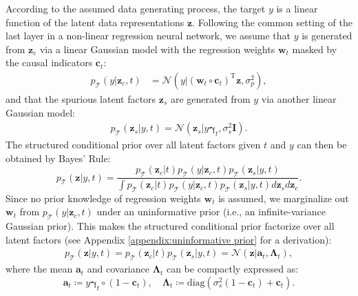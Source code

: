 \documentclass[10pt]{article} %
\theoremstyle{plain}
\theoremstyle{definition}
\begin{document}
According to the assumed data generating process, the target $y$ is a linear function of the latent data representations $\mathbf{z}$. Following the common setting of the last layer in a non-linear regression neural network, we assume that $y$ is generated from $\mathbf{z}_c$ via a linear Gaussian model with the regression weights $\mathbf{w}_t$ masked by the causal indicators $\mathbf{c}_t$:
\begin{align}\label{eq: regression-model}
    p_{\mathcal{T}}(y|\mathbf{z}_c,t) & =\mathcal{N}(y|(\mathbf{w}_t\circ\mathbf{c}_t)^{\text{T}}\mathbf{z},\sigma_{p}^{2}),
\end{align}
and that the spurious latent factors $\mathbf{z}_s$ are generated from $y$ via another linear Gaussian model:
\begin{align}
    p_{\mathcal{T}}(\mathbf{z}_s|y,t)=\mathcal{N}(\mathbf{z}_s|y\boldsymbol{\gamma}_t,\sigma_s^2\mathbf{I}).\label{eq:spurious_prior}
\end{align}
The structured conditional prior over all latent factors given $t$ and $y$ can then be obtained by Bayes' Rule:
\begin{equation}
    p_{\mathcal{T}}(\mathbf{z}|y,t)=\frac{p_{\mathcal{T}}(\mathbf{z}_c|t)p_{\mathcal{T}}(y|\mathbf{z}_c,t)p_{\mathcal{T}}(\mathbf{z}_s|y,t)}{\int p_{\mathcal{T}}(\mathbf{z}_c|t)p_{\mathcal{T}}(y|\mathbf{z}_c,t)p_{\mathcal{T}}(\mathbf{z}_s|y,t)d\mathbf{z}_s d\mathbf{z}_c}.
\end{equation}
Since no prior knowledge of regression weights $\mathbf{w}_t$ is assumed, we marginalize out $\mathbf{w}_t$ from $p_{\mathcal{T}}(y|\mathbf{z}_c,t)$ under an uninformative prior (i.e., an infinite-variance Gaussian prior). This makes the structured conditional prior factorize over all latent factors (see Appendix \ref{appendix:uninformative prior} for a derivation):
\begin{align}\label{eq:lin-causal-prior}
        p_{\mathcal{T}}(\mathbf{z}|y,t)
        =p_{\mathcal{T}}(\mathbf{z}_c|t)p_{\mathcal{T}}(\mathbf{z}_s|y,t)
        =\mathcal{N}(\mathbf{z}|\mathbf{a}_t,\boldsymbol{\Lambda}_t),
\end{align}
where the mean $\mathbf{a}_t$ and covariance $\boldsymbol{\Lambda}_t$ can be compactly expressed as:
\begin{equation}
    \mathbf{a}_t\coloneqq y\boldsymbol{\gamma}_t\circ(1-\mathbf{c}_t),\quad
    \boldsymbol{\Lambda}_t\coloneqq \text{diag}(\sigma_{s}^{2}(1-\mathbf{c}_t)+\mathbf{c}_t).\label{eq:con_prior_mean_var}
\end{equation}
\end{document}
